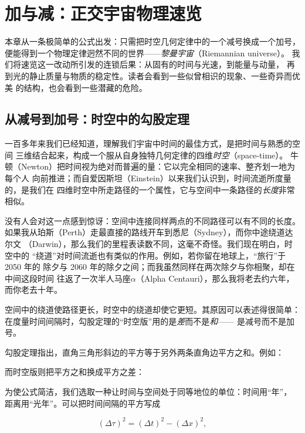\chapter{加与减：正交宇宙物理速览}

本章从一条极简单的公式出发：只需把时空几何定律中的一个减号换成一个加号，
便能得到一个物理定律迥然不同的世界——\emph{黎曼宇宙}（Riemannian universe）。
我们将速览这一改动所引发的连锁后果：从固有的时间与光速，到能量与动量，
再到光的静止质量与物质的稳定性。读者会看到一些似曾相识的现象、一些奇异而优美
的结构，也会看到一些潜藏的危险。

\section{从减号到加号：时空中的勾股定理}

一百多年来我们已经知道，理解我们宇宙中时间的最佳方式，是把时间与熟悉的空间
三维结合起来，构成一个服从自身独特几何定律的四维\emph{时空}（space-time）。
牛顿（Newton）把时间视为绝对而普遍的量：它以完全相同的速率、整齐划一地为每个人
向前推进；而自爱因斯坦（Einstein）以来我们认识到，时间流逝所度量的，是我们在
四维时空中所走路径的一个属性，它与空间中一条路径的\emph{长度}非常相似。

没有人会对这一点感到惊讶：空间中连接同样两点的不同路径可以有不同的长度。
如果我从珀斯（Perth）走最直接的路线开车到悉尼（Sydney），而你中途绕道达尔文
（Darwin），那么我们的里程表读数不同，这毫不奇怪。我们现在明白，时空中的
“绕道”对时间流逝也有类似的作用。例如，若你留在地球上，“旅行”于 2050 年的
除夕与 2060 年的除夕之间；而我虽然同样在两次除夕与你相聚，却在中间这段时间
往返了一次半人马座$\alpha$（Alpha Centauri），那么我将老去约六年，而你老去十年。

空间中的绕道使路径更长，时空中的绕道却使它更短。其原因可以表述得很简单：
在度量时间间隔时，勾股定理的“时空版”用的是\emph{差}而不是\emph{和}——
是减号而不是加号。

勾股定理指出，直角三角形斜边的平方等于另外两条直角边平方之和。例如：


而时空版则把平方之和换成平方之差：


为使公式简洁，我们选取一种让时间与空间处于同等地位的单位：时间用“年”，
距离用“光年”。可以把时间间隔的平方写成

\begin{equation}
(\Delta \tau)^2 = (\Delta t)^2 - (\Delta x)^2 , \tag{1}
\end{equation}

